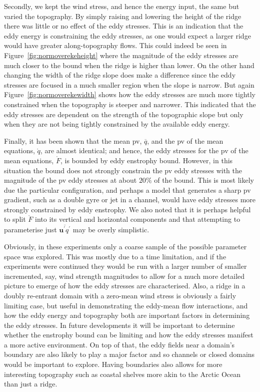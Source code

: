 \documentclass[12pt,a4paper]{report}
\newcommand*\thkmean[1]{\overline{#1}}
\newcommand*\thkres[1]{{#1}^{\prime}}
\newcommand*\spec[1]{\mathring{#1}}
\newcommand*\figref[1]{Figure~\ref{#1}}
\begin{document}
Secondly, we kept the wind stress, and hence the energy input, the same but varied
the topography. By simply raising and lowering the height of the ridge there was
little or no effect of the eddy stresses. This is an indication that the eddy energy 
is constraining the eddy stresses, as one would expect a larger ridge would have
greater along-topography flows. This could indeed be seen in \figref{fig:normoverekeheight}
where the magnitude of the eddy stresses are much closer to the bound when the ridge is
 higher than lower. On the other hand changing the width of the ridge slope does make
 a difference since the eddy stresses are focused in a much smaller region when the slope is narrow. But again \figref{fig:normoverekewidth} shows how the eddy stresses are much
 more tightly constrained when the topography is steeper and narrower. This indicated that the eddy
 stresses are dependent on the  strength of the topographic slope but only when they are not being tightly constrained by the available eddy energy.
 
 Finally, it has been shown that the mean \gls{pv}, $\thkmean{q}$, and the \gls{pv} of the mean
 equations, $\spec{q}$, are almost identical; and hence, the eddy stresses for
 the \gls{pv} of the mean
 equations, $\spec{F}$, is 
 bounded by eddy enstrophy bound. However, in this situation the bound does not strongly constrain
 the \gls{pv} eddy stresses with the magnitude of the \gls{pv} eddy  
 stresses at about $20\%$ of the bound. This is most likely
 due the particular configuration, and perhaps a model that generates a sharp \gls{pv}
 gradient, such as a double gyre or jet in a channel, would have eddy stresses more 
 strongly constrained by eddy enstrophy. We also noted that it is perhaps helpful to 
 split $\spec{F}$ into its vertical and horizontal components and that attempting
 to parameterise just $\thkmean{\thkres{\boldsymbol{u}}\thkres{q}}$ may be overly simplistic.

 Obviously, in these experiments only a coarse sample of the possible parameter space was
  explored. This was mostly due to a time limitation, and if the experiments were continued
   they would be run with a larger number of smaller incremented, say, wind strength
  magnitudes to allow for a much more detailed picture to emerge of how the eddy stresses
  are characterised. Also, a ridge in a doubly re-entrant domain with a zero-mean wind
  stress is obviously a fairly limiting case, but useful in demonstrating the eddy-mean flow
  interactions, and how the eddy
  energy and topography both are important factors in determining the eddy stresses. 
  In future developments it will be important to determine whether the enstrophy bound 
  can be limiting 
  and how the eddy stresses manifest a more active environment. On top of that, the eddy fields 
  near a domain's boundary are also likely to play a major 
  factor and so channels or closed domains would be important to explore.
  Having boundaries also allows for more interesting topography such as 
  coastal shelves more akin to the Arctic Ocean than just a ridge. 
  
\end{document}
